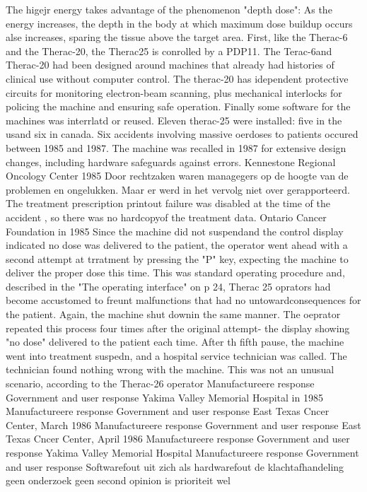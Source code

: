 The higejr energy takes advantage of the phenomenon "depth dose": As the energy increases, the depth in the body at which maximum dose buildup occurs alse increases, sparing the tissue above the target area.
First, like the Therac-6 and the Therac-20, the Therac25 is conrolled by a PDP11. The Terac-6and Therac-20 had been designed around machines that already had histories of clinical use without computer control.
The therac-20 has idependent protective circuits for monitoring electron-beam scanning, plus mechanical interlocks for policing the machine and ensuring safe operation.
Finally some software for the machines was interrlatd or reused.
Eleven therac-25 were installed: five in the usand six in canada. Six accidents involving massive oerdoses to patients occured between 1985 and 1987. The machine was recalled in 1987 for extensive design changes, including hardware	 safeguards against errors.
Kennestone Regional Oncology Center 1985
Door rechtzaken waren managegers op de hoogte van de problemen en ongelukken. Maar er werd in het vervolg niet over gerapporteerd.
The treatment prescription printout failure was disabled at the time of the accident , so there was no hardcopyof the treatment data.
Ontario Cancer Foundation in 1985
Since the machine did not suspendand the control display indicated no dose was delivered to the patient, the operator went ahead with a second attempt at trratment by pressing the "P" key, expecting the machine to deliver the proper dose this time. This was standard operating procedure and, described in the "The operating interface" on p 24, Therac 25
oprators had become accustomed to freunt malfunctions that had no untowardconsequences for the patient. Again, the machine shut downin the same manner. The oeprator repeated this process four times after the original attempt- the display showing "no dose" delivered to the patient each time. After th fifth pause, the machine went into treatment suspedn, and a  hospital service technician was called.
The technician found nothing wrong with the machine. This was not an unusual scenario, according to the Therac-26 operator
Manufactureere response
Government and user response
Yakima Valley Memorial Hospital in 1985
Manufactureere response
Government and user response
East Texas Cncer Center, March 1986
Manufactureere response
Government and user response
East Texas Cncer Center, April 1986
Manufactureere response
Government and user response
Yakima Valley Memorial Hospital
Manufactureere response
Government and user response
Softwarefout uit zich als hardwarefout de klachtafhandeling geen onderzoek geen second opinion is prioriteit wel 

